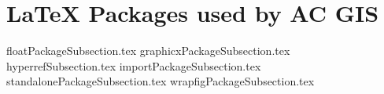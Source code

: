 \documentclass[class=article , crop=false, titlepage, twoside, multi={itemize, figure, verbatim}, float=false]{standalone}
\title{}  %
\begin{document}
\ifstandalone
\maketitle %
\clearpage
\tableofcontents %
\clearpage
\fi

\section[\LaTeX{} Packages]{\LaTeX{} Packages used by AC GIS}

{floatPackageSubsection.tex}
{graphicxPackageSubsection.tex}
{hyperrefSubsection.tex}
{importPackageSubsection.tex}
{standalonePackageSubsection.tex}
{wrapfigPackageSubsection.tex}
\end{document}
